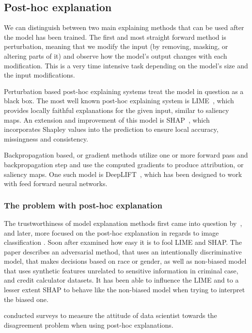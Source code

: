 \documentclass[]{article}
\begin{document}
\subsection{Post-hoc explanation}

We can distinguish between two main explaining methods that can be used after the model has been trained. The first and most straight forward method is perturbation, meaning that we modify the input (by removing, masking, or altering parts of it) and observe how the model's output changes with each modification. This is a very time intensive task depending on the model's size and the input modifications.

Perturbation based post-hoc explaining systems treat the model in question as a black box. The most well known post-hoc explaining system is LIME~\cite{Ribeiro:2016}, which provides locally faithful explanations for the given input, similar to saliency maps. An extension and improvement of this model is SHAP~\cite{Lundberg:2017}, which incorporates Shapley values into the prediction to ensure local accuracy, missingness and consistency.

Backpropagation based, or gradient methods utilize one or more forward pass and backpropagation step and use the computed gradients to produce attribution, or saliency maps. One such model is DeepLIFT~\cite{Shrikumar:2017}, which has been designed to work with feed forward neural networks.

\subsubsection{The problem with post-hoc explanation}

The trustworthiness of model explanation methods first came into question by~\cite{Lipton:2018}, and later, more focused on the post-hoc explanation in regards to image classification \cite{Dombrowski:2019}. Soon after \cite{Slack:2020} examined how easy it is to fool LIME and SHAP. The paper describes an adversarial method, that uses an intentionally discriminative model, that makes decisions based on race or gender, as well as non-biased model that uses synthetic features unrelated to sensitive information in criminal case, and credit calculator datasets. It has been able to influence the LIME and to a lesser extent SHAP to behave like the non-biased model when trying to interpret the biased one.

\cite{Krishna:2022} conducted surveys to measure the attitude of data scientist towards the disagreement problem when using post-hoc explanations.
\end{document}
